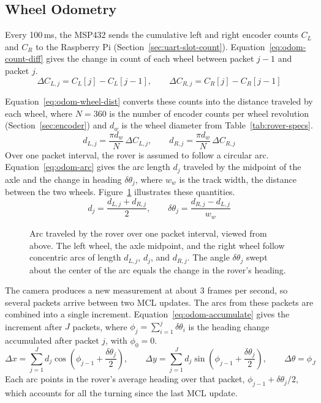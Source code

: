 \subsection{Wheel Odometry}
\label{sec:wheel-odometry}
Every 100\,ms, the MSP432 sends the cumulative left and right encoder counts $C_L$ and $C_R$ to
the Raspberry Pi (Section~\ref{sec:uart-slot-count}). Equation~\ref{eq:odom-count-diff}
gives the change in count of each wheel between packet $j-1$ and packet $j$.
\begin{equation}
  \label{eq:odom-count-diff}
  \Delta C_{L,j} = C_{L}[j] - C_{L}[j-1], \qquad
  \Delta C_{R,j} = C_{R}[j] - C_{R}[j-1]
\end{equation}

Equation~\ref{eq:odom-wheel-dist} converts these counts into the distance traveled by each
wheel, where $N = 360$ is the number of encoder counts per wheel revolution (Section~\ref{sec:encoder}) and
$d_w$ is the wheel diameter from Table~\ref{tab:rover-specs}.
\begin{equation}
  \label{eq:odom-wheel-dist}
  d_{L,j} = \frac{\pi d_w}{N}\, \Delta C_{L,j}, \qquad
  d_{R,j} = \frac{\pi d_w}{N}\, \Delta C_{R,j}
\end{equation}
Over one packet interval, the rover is assumed to follow a circular arc.
Equation~\ref{eq:odom-arc} gives the arc length $d_j$ traveled by the midpoint of the axle
and the change in heading $\delta\theta_j$, where $w_w$ is the track width, the distance between the two wheels.
Figure~\ref{fig:odom-arc} illustrates these quantities.
\begin{equation}
  \label{eq:odom-arc}
  d_j = \frac{d_{L,j} + d_{R,j}}{2}, \qquad
  \delta\theta_j = \frac{d_{R,j} - d_{L,j}}{w_w}
\end{equation}

\begin{figure}[htbp]
  \centering
  
  \caption[Arc traveled by the rover over one packet interval]{Arc traveled by the rover
    over one packet interval, viewed from above. The left wheel, the axle midpoint, and the
    right wheel follow concentric arcs of length $d_{L,j}$, $d_j$, and $d_{R,j}$. The angle
    $\delta\theta_j$ swept about the center of the arc equals the change in the rover's
    heading.}
  \label{fig:odom-arc}
\end{figure}

The camera produces a new measurement at about 3 frames per second, so several packets
arrive between two MCL updates. The arcs from these packets are combined into a single
increment. Equation~\ref{eq:odom-accumulate} gives the increment after $J$ packets, where
$\phi_j = \sum_{i=1}^{j} \delta\theta_i$ is the heading change accumulated after packet $j$,
with $\phi_0 = 0$.
\begin{equation}
  \label{eq:odom-accumulate}
  \Delta x = \sum_{j=1}^{J} d_j \cos\!\left(\phi_{j-1} + \frac{\delta\theta_j}{2}\right),
  \qquad
  \Delta y = \sum_{j=1}^{J} d_j \sin\!\left(\phi_{j-1} + \frac{\delta\theta_j}{2}\right),
  \qquad
  \Delta\theta = \phi_J
\end{equation}
Each arc points in the rover's average heading over that packet, $\phi_{j-1} + \delta\theta_j/2$,
which accounts for all the turning since the last MCL update.

